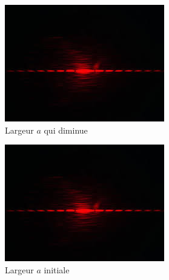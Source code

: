 \documentclass[12pt]{article}
\begin{document}
\begin{figure}[h!]
    \centering
    \begin{subfigure}{.33\textwidth}
      \centering
        \includegraphics[width=.9\linewidth]{img/a_remplacer_par_nos_images.jpg}
      \caption{Largeur $a$ qui diminue}
      \label{fig:sfig1}
    \end{subfigure}%
    \begin{subfigure}{.33\textwidth}
      \centering
      \includegraphics[width=.9\linewidth]{img/a_remplacer_par_nos_images.jpg}
      \caption{Largeur $a$ initiale}
      \label{fig:sfig2}
    \end{subfigure}
    \begin{subfigure}{.33\textwidth}
        \centering

\end{subfigure}
\end{figure}
\end{document}
